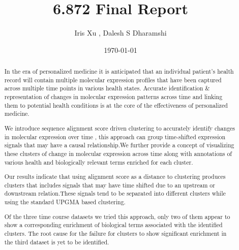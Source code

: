 \documentclass[aps,prd,final,onecolumn,a4paper,10pt]{revtex4}
\begin{document}
\title{6.872 Final Report}
\author{Iris Xu , Dalesh S Dharamshi }	
\date{\today} 

\begin{abstract}
\noindent
  In the era of personalized medicine it is anticipated that an individual patient's health record will contain multiple molecular expression profiles that have been captured across multiple time points in various health states. Accurate identification \& representation of changes in molecular expression patterns across time and linking them to potential health conditions is at the core of the effectiveness of personalized medicine. 
  
  We introduce sequence alignment score driven clustering to accurately identify changes in molecular expression over time , this approach can group time-shifted expression signals that may have a causal relationship.We further provide a concept of visualizing these clusters of change in molecular expression across time along with annotations of various health and biologically relevant terms enriched for each cluster.
  
  Our results indicate that using alignment score as a distance to clustering produces clusters that includes signals that may have time shifted due to an upstream or downstream relation.These signals tend to be separated into different clusters while using the standard UPGMA based clustering. 
  
  Of the three time course datasets we tried this approach, only two of them appear to show a corresponding enrichment of biological terms associated with the identified clusters. The root cause for the failure for clusters to show significant enrichment in the third dataset is yet to be identified.
  
\end{abstract}

\maketitle

\pagestyle{myheadings}
\thispagestyle{empty}

\end{document}
